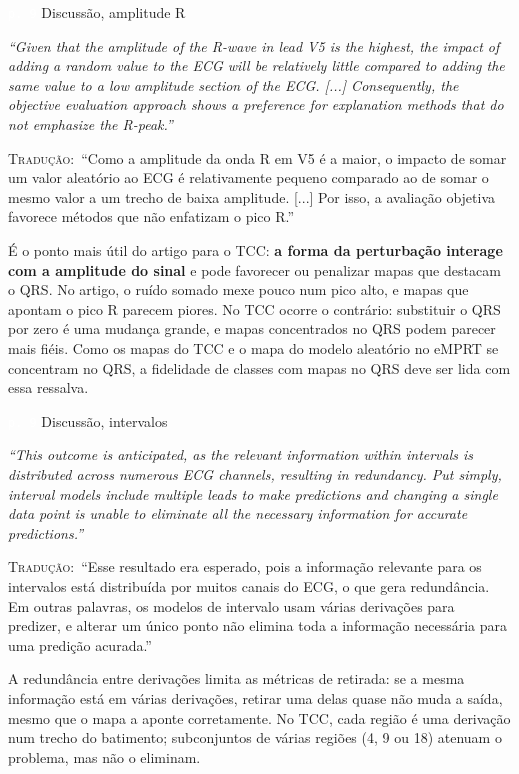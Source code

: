 \documentclass[11pt,a4paper]{article}
\newcommand{\pagechip}[1]{{\setlength{\fboxsep}{1.5pt}\colorbox{cAcc}{\textcolor{white}{\scriptsize\texttt{#1}}}}}
\newenvironment{origquote}{\par\itshape\small}{\par}
\newenvironment{tradquote}{\par\small\textsc{Tradução:}\ }{\par}
\newcommand{\explab}[1]{\par\smallskip{\small\color{cAcc}\textbf{\MakeUppercase{#1}}}\par}
\begin{document}
\begin{citacard}{\pagechip{p. 9} Discussão, amplitude R}
\begin{origquote}“Given that the amplitude of the R-wave in lead V5 is the highest, the impact of adding a random value to the ECG will be relatively little compared to adding the same value to a low amplitude section of the ECG. [...] Consequently, the objective evaluation approach shows a preference for explanation methods that do not emphasize the R-peak.”\end{origquote}
\begin{tradquote}“Como a amplitude da onda R em V5 é a maior, o impacto de somar um valor aleatório ao ECG é relativamente pequeno comparado ao de somar o mesmo valor a um trecho de baixa amplitude. [...] Por isso, a avaliação objetiva favorece métodos que não enfatizam o pico R.”\end{tradquote}
\explab{Explicação}
É o ponto mais útil do artigo para o TCC: \textbf{a forma da perturbação interage com a amplitude do sinal} e pode favorecer ou penalizar mapas que destacam o QRS. No artigo, o ruído somado mexe pouco num pico alto, e mapas que apontam o pico R parecem piores. No TCC ocorre o contrário: substituir o QRS por zero é uma mudança grande, e mapas concentrados no QRS podem parecer mais fiéis. Como os mapas do TCC e o mapa do modelo aleatório no eMPRT se concentram no QRS, a fidelidade de classes com mapas no QRS deve ser lida com essa ressalva.
\end{citacard}

\begin{citacard}{\pagechip{p. 9} Discussão, intervalos}
\begin{origquote}“This outcome is anticipated, as the relevant information within intervals is distributed across numerous ECG channels, resulting in redundancy. Put simply, interval models include multiple leads to make predictions and changing a single data point is unable to eliminate all the necessary information for accurate predictions.”\end{origquote}
\begin{tradquote}“Esse resultado era esperado, pois a informação relevante para os intervalos está distribuída por muitos canais do ECG, o que gera redundância. Em outras palavras, os modelos de intervalo usam várias derivações para predizer, e alterar um único ponto não elimina toda a informação necessária para uma predição acurada.”\end{tradquote}
\explab{Explicação}
A redundância entre derivações limita as métricas de retirada: se a mesma informação está em várias derivações, retirar uma delas quase não muda a saída, mesmo que o mapa a aponte corretamente. No TCC, cada região é uma derivação num trecho do batimento; subconjuntos de várias regiões (4, 9 ou 18) atenuam o problema, mas não o eliminam.
\end{citacard}
\end{document}
